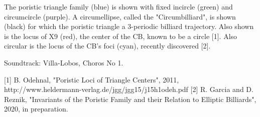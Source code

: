 The poristic triangle family (blue) is shown with fixed incircle (green) and circumcircle (purple). A circumellipse, called the "Circumbilliard", is shown (black) for which the poristic triangle a 3-periodic billiard trajectory. Also shown is the locus of X9 (red), the center of the CB, known to be a circle [1]. Also circular is the locus of the CB's foci (cyan), recently discovered [2].

Soundtrack: Villa-Lobos, Choros No 1.

[1] B. Odehnal, "Poristic Loci of Triangle Centers", 2011, http://www.heldermann-verlag.de/jgg/jgg15/j15h1odeh.pdf
[2] R. Garcia and D. Reznik, "Invariants of the Poristic Family and their Relation to Elliptic Billiards", 2020, in preparation.